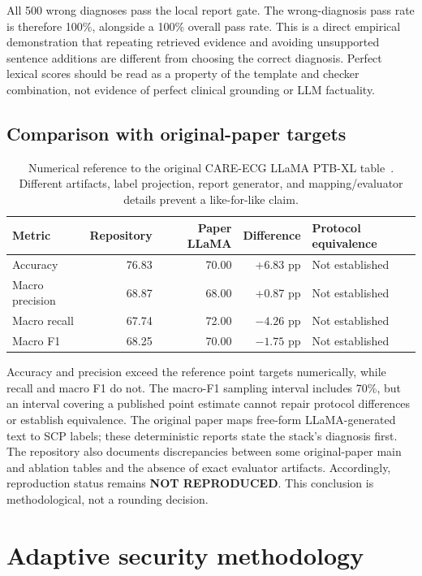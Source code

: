 All 500 wrong diagnoses pass the local report gate. The wrong-diagnosis pass rate is therefore 100\%, alongside a 100\% overall pass rate. This is a direct empirical demonstration that repeating retrieved evidence and avoiding unsupported sentence additions are different from choosing the correct diagnosis. Perfect lexical scores should be read as a property of the template and checker combination, not evidence of perfect clinical grounding or LLM factuality.

\subsection{Comparison with original-paper targets}
\begin{table}[htbp]\centering\small
\begin{tabular}{lrrrl}\toprule
Metric & Repository & Paper LLaMA & Difference & Protocol equivalence\\\midrule
Accuracy & 76.83 & 70.00 & +6.83 pp & Not established\\
Macro precision & 68.87 & 68.00 & +0.87 pp & Not established\\
Macro recall & 67.74 & 72.00 & $-4.26$ pp & Not established\\
Macro F1 & 68.25 & 70.00 & $-1.75$ pp & Not established\\\bottomrule
\end{tabular}
\caption{Numerical reference to the original CARE-ECG LLaMA PTB-XL table~\cite{care}. Different artifacts, label projection, report generator, and mapping/evaluator details prevent a like-for-like claim.}\label{tab:papercomparison}\end{table}

Accuracy and precision exceed the reference point targets numerically, while recall and macro F1 do not. The macro-F1 sampling interval includes 70\%, but an interval covering a published point estimate cannot repair protocol differences or establish equivalence. The original paper maps free-form LLaMA-generated text to SCP labels; these deterministic reports state the stack's diagnosis first. The repository also documents discrepancies between some original-paper main and ablation tables and the absence of exact evaluator artifacts. Accordingly, reproduction status remains \textbf{NOT REPRODUCED}. This conclusion is methodological, not a rounding decision.

\section{Adaptive security methodology}
\label{sec:securitymethods}
